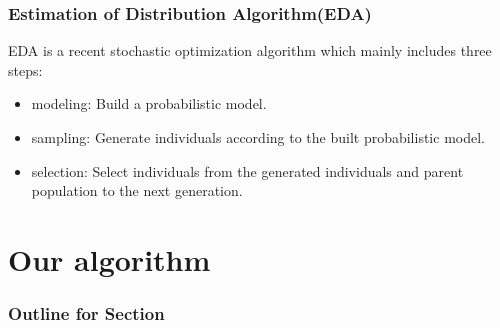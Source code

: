 \documentclass[xcolor=dvipsnames]{beamer}
\begin{document}
    \begin{frame}
    \frametitle{Estimation of Distribution Algorithm(EDA)}
    EDA is a recent stochastic optimization algorithm which mainly includes three steps:
    \begin{itemize}
    \item modeling: Build a probabilistic model.
    \item sampling: Generate individuals according to the built probabilistic model.
    \item selection: Select individuals from the generated individuals and parent population to the next generation.
    \end{itemize}
    \end{frame}


    \section{Our algorithm}
    \begin{frame}
      \frametitle{Outline for Section \thesection}
      \tableofcontents[currentsection]
    \end{frame}
\end{document}
